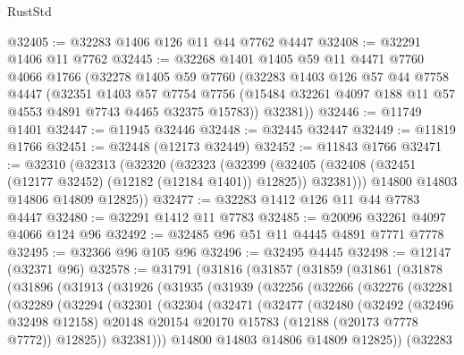 \begin{lexlean}{RustStd}
\begin{coremodule}
@32405 := @32283 @1406 @126 @11 @44 @7762 @4447
@32408 := @32291 @1406 @11 @7762
@32445 := @32268
    @1401
    @1405
    @59
    @11
    @4471
    @7760
    @4066
    @1766
    (@32278
      @1405
      @59
      @7760
      (@32283
        @1403
        @126
        @57
        @44
        @7758
        @4447
        (@32351
          @1403
          @57
          @7754
          @7756
          (@15484 @32261 @4097 @188 @11 @57 @4553 @4891 @7743 @4465 @32375 @15783))
        @32381))
@32446 := @11749 @1401
@32447 := @11945 @32446
@32448 := @32445 @32447
@32449 := @11819 @1766
@32451 := @32448 (@12173 @32449)
@32452 := @11843 @1766
@32471 := @32310
    (@32313
      (@32320
        (@32323
          (@32399 (@32405 (@32408 (@32451 (@12177 @32452) (@12182 (@12184 @1401)) @12825)) @32381)))
        @14800
        @14803
        @14806
        @14809
        @12825))
@32477 := @32283 @1412 @126 @11 @44 @7783 @4447
@32480 := @32291 @1412 @11 @7783
@32485 := @20096 @32261 @4097 @4066 @124 @96
@32492 := @32485 @96 @51 @11 @4445 @4891 @7771 @7778
@32495 := @32366 @96 @105 @96
@32496 := @32495 @4445
@32498 := @12147 (@32371 @96)
@32578 := @31791
    (@31816
      (@31857
        (@31859
          (@31861
            (@31878
              (@31896
                (@31913
                  (@31926
                    (@31935
                      (@31939
                        (@32256
                          (@32266
                            (@32276
                              (@32281
                                (@32289
                                  (@32294
                                    (@32301
                                      (@32304
                                        (@32471
                                          (@32477
                                            (@32480
                                              (@32492
                                                (@32496 @32498 @12158)
                                                @20148
                                                @20154
                                                @20170
                                                @15783
                                                (@12188 (@20173 @7778 @7772))
                                                @12825))
                                            @32381)))
                                      @14800
                                      @14803
                                      @14806
                                      @14809
                                      @12825))
                                  (@32283

\end{coremodule}
\end{lexlean}
